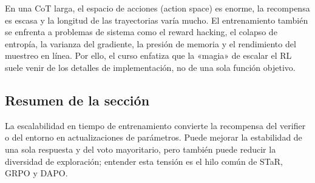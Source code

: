En una CoT larga, el espacio de acciones (action space) es enorme, la recompensa es escasa y la longitud de las trayectorias varía mucho. El entrenamiento también se enfrenta a problemas de sistema como el reward hacking, el colapso de entropía, la varianza del gradiente, la presión de memoria y el rendimiento del muestreo en línea. Por ello, el curso enfatiza que la «magia» de escalar el RL suele venir de los detalles de implementación, no de una sola función objetivo.

\subsection{Resumen de la sección}

La escalabilidad en tiempo de entrenamiento convierte la recompensa del verifier o del entorno en actualizaciones de parámetros. Puede mejorar la estabilidad de una sola respuesta y del voto mayoritario, pero también puede reducir la diversidad de exploración; entender esta tensión es el hilo común de STaR, GRPO y DAPO.
